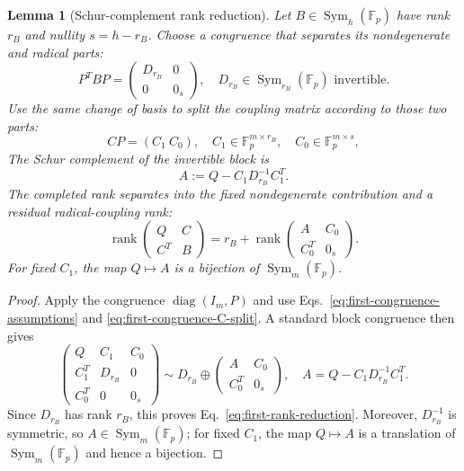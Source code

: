 \documentclass[11pt]{article}
\newcommand{\F}{\mathbb F}
\newcommand{\Sym}{\operatorname{Sym}}
\newcommand{\rank}{\operatorname{rank}}
\newcommand{\1}{\mathbf 1}
\theoremstyle{plain}
\newtheorem{lemma}[theorem]{Lemma}
\theoremstyle{definition}
\theoremstyle{remark}
\begin{document}
\begin{lemma}[Schur-complement rank reduction]
\label{lem:first-congruence}
Let $B\in\Sym_h(\F_p)$ have rank $r_B$ and nullity
$s=h-r_B$.  Choose a congruence that separates its nondegenerate and radical
parts:
\begin{equation}
 P^TBP=\begin{pmatrix}D_{r_B}&0\\0&0_s\end{pmatrix},
 \quad D_{r_B}\in\Sym_{r_B}(\F_p)
 \text{ invertible}.
 \label{eq:first-congruence-assumptions}
\end{equation}
Use the same change of basis to split the coupling matrix according to those
two parts:
\begin{equation}
 CP=(C_1\ C_0),
 \quad C_1\in\F_p^{m\times r_B},\quad
 C_0\in\F_p^{m\times s},
 \label{eq:first-congruence-C-split}
\end{equation}
The Schur complement of the invertible block is
\begin{equation}
 A:=Q-C_1D_{r_B}^{-1}C_1^T.
 \label{eq:first-congruence-A-definition}
\end{equation}
The completed rank separates into the fixed nondegenerate contribution and a
residual radical-coupling rank:
\begin{equation}
 \rank\begin{pmatrix}Q&C\\C^T&B\end{pmatrix}
 =r_B+
 \rank\begin{pmatrix}A&C_0\\C_0^T&0_s\end{pmatrix}.
 \label{eq:first-rank-reduction}
\end{equation}
For fixed $C_1$, the map $Q\mapsto A$ is a bijection of
$\Sym_m(\F_p)$.
\end{lemma}
\begin{proof}
Apply the congruence $\operatorname{diag}(I_m,P)$ and use
Eqs.~\eqref{eq:first-congruence-assumptions} and
\eqref{eq:first-congruence-C-split}.  A standard block congruence then gives
\begin{equation}
 \begin{pmatrix}
 Q&C_1&C_0\\
 C_1^T&D_{r_B}&0\\
 C_0^T&0&0_s
 \end{pmatrix}
 \sim
 D_{r_B}\oplus
 \begin{pmatrix}A&C_0\\C_0^T&0_s\end{pmatrix},
 \quad
 A=Q-C_1D_{r_B}^{-1}C_1^T.
 \label{eq:schur-direct-sum-form}
\end{equation}
Since $D_{r_B}$ has rank $r_B$, this proves
Eq.~\eqref{eq:first-rank-reduction}.  Moreover, $D_{r_B}^{-1}$ is symmetric,
so $A\in\Sym_m(\F_p)$; for fixed $C_1$, the map $Q\mapsto A$ is a
translation of $\Sym_m(\F_p)$ and hence a bijection.
\end{proof}
\end{document}
